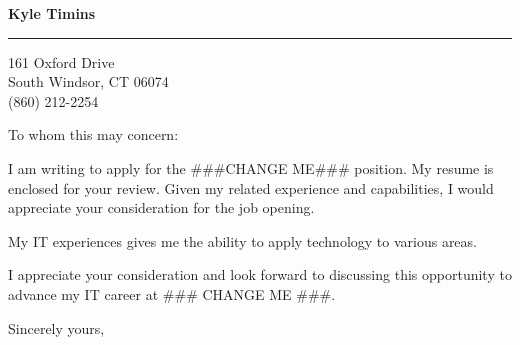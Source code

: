 \documentclass{letter} %
\begin{document}
\signature{Kyle Timins}            	   %
\longindentation=0pt                       %
\let\raggedleft\raggedright                %
 
 
\begin{letter}{}

\begin{center}
{\large\bf Kyle Timins} 
\end{center}
\medskip\hrule height 1pt
\begin{center}
{161 Oxford Drive \\   South Windsor, CT 06074 \\ (860) 212-2254} 
\end{center} \vspace{2 cm} %
 
 
\opening{To whom this may concern:} 

\noindent I am writing to apply for the \#\#\#CHANGE ME\#\#\# position.
My resume is enclosed for your review. Given my related experience and 
capabilities, I would appreciate your consideration for the job opening.


\noindent My IT experiences gives me the ability to apply technology to various
areas. 

\noindent I appreciate your consideration and look forward to discussing
this opportunity to advance my IT career at 
\#\#\# CHANGE ME \#\#\#. %
 
\closing{Sincerely yours,} 
 

 

\end{letter}

\vfill
\end{document}
